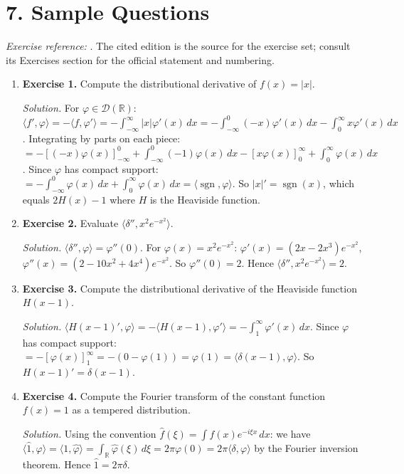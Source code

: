 \section*{7. Sample Questions}
\emph{Exercise reference:} \cite{distribution_theory_ref1}. The cited edition is the source for the exercise set; consult its Exercises section for the official statement and numbering.
\begin{enumerate}[leftmargin=*,itemsep=0.9em]

\item \textbf{Exercise 1.} Compute the distributional derivative of $f(x)=|x|$.

\emph{Solution.} For $\varphi\in\mathcal D(\mathbb R)$: $\langle f',\varphi\rangle=-\langle f,\varphi'\rangle=-\int_{-\infty}^{\infty}|x|\varphi'(x)\,dx=-\int_{-\infty}^{0}(-x)\varphi'(x)\,dx-\int_{0}^{\infty}x\varphi'(x)\,dx$. Integrating by parts on each piece: $=-[(-x)\varphi(x)]_{-\infty}^0+\int_{-\infty}^0(-1)\varphi(x)\,dx-[x\varphi(x)]_0^{\infty}+\int_0^{\infty}\varphi(x)\,dx$. Since $\varphi$ has compact support: $=-\int_{-\infty}^0\varphi(x)\,dx+\int_0^{\infty}\varphi(x)\,dx=\langle\operatorname{sgn},\varphi\rangle$. So $|x|'=\operatorname{sgn}(x)$, which equals $2H(x)-1$ where $H$ is the Heaviside function.

\item \textbf{Exercise 2.} Evaluate $\langle\delta'',x^2e^{-x^2}\rangle$.

\emph{Solution.} $\langle\delta'',\varphi\rangle=\varphi''(0)$. For $\varphi(x)=x^2e^{-x^2}$: $\varphi'(x)=(2x-2x^3)e^{-x^2}$, $\varphi''(x)=(2-10x^2+4x^4)e^{-x^2}$. So $\varphi''(0)=2$. Hence $\langle\delta'',x^2e^{-x^2}\rangle=2$.

\item \textbf{Exercise 3.} Compute the distributional derivative of the Heaviside function $H(x-1)$.

\emph{Solution.} $\langle H(x-1)',\varphi\rangle=-\langle H(x-1),\varphi'\rangle=-\int_1^{\infty}\varphi'(x)\,dx$. Since $\varphi$ has compact support: $=-[\varphi(x)]_1^{\infty}=-(0-\varphi(1))=\varphi(1)=\langle\delta(x-1),\varphi\rangle$. So $H(x-1)'=\delta(x-1)$.

\item \textbf{Exercise 4.} Compute the Fourier transform of the constant function $f(x)=1$ as a tempered distribution.

\emph{Solution.} Using the convention $\hat f(\xi)=\int f(x)e^{-i\xi x}\,dx$: we have $\langle\hat 1,\varphi\rangle=\langle 1,\hat\varphi\rangle=\int_{\mathbb R}\hat\varphi(\xi)\,d\xi=2\pi\varphi(0)=2\pi\langle\delta,\varphi\rangle$ by the Fourier inversion theorem. Hence $\hat 1=2\pi\delta$.


\end{enumerate}
